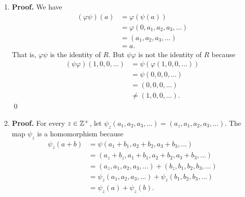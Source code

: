 \begin{enumerate}
      \begin{enumerate}
         \item \textbf{Proof.} We have
               \begin{align*}
                  (\varphi\psi)(a) &= \varphi(\psi(a)) \\
                     &= \varphi(0, a_1, a_2, a_3, \ldots) \\
                     &= (a_1, a_2, a_3, \ldots) \\
                     &= a.
               \end{align*}
               That is, $\varphi\psi$ is the identity of $R$. But $\psi\varphi$
               is not the identity of $R$ because
               \begin{align*}
                  (\psi\varphi)(1, 0, 0, \ldots) &=
                     \psi(\varphi(1, 0, 0, \ldots)) \\
                     &= \psi(0, 0, 0, \ldots) \\
                     &= (0, 0, 0, \ldots) \\
                     &\neq (1, 0, 0, \ldots).
               \end{align*} \qed
         \item \textbf{Proof.} For every $z \in \mathbb{Z}^+$, let
               $\psi_z(a_1, a_2, a_3, \ldots) = (a_z, a_1, a_2, a_3, \ldots)$.
               The map $\psi_z$ is a homomorphism because
               \begin{align*}
                  \psi_z(a + b) &= \psi(a_1 +b_1, a_2+b_2, a_3 + b_3, \ldots) \\
                     &= (a_z + b_z, a_1 + b_1, a_2 + b_2, a_3 + b_3, \ldots) \\
                     &= (a_z, a_1, a_2, a_3, \ldots) +
                        (b_z, b_1, b_2, b_3, \ldots) \\
                     &= \psi_z(a_1, a_2, a_3, \ldots) +
                        \psi_z(b_1, b_2, b_3, \ldots) \\
                     &= \psi_z(a) + \psi_z(b).
               \end{align*}


\end{enumerate}
\end{enumerate}
